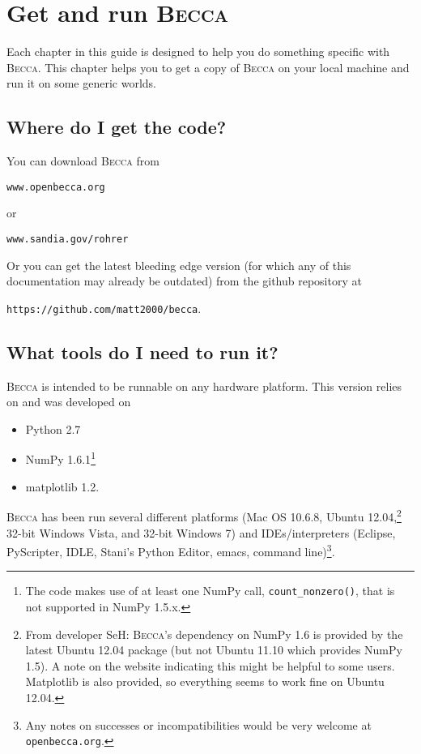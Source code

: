 \chapter{Get and run \textsc{Becca}}

Each chapter in this guide is designed to help you do something specific with \textsc{Becca}. This chapter helps you to get a copy of \textsc{Becca} on your local machine and run it on some generic worlds.

\section{Where do I get the code?}

You can download \textsc{Becca} from 

\texttt{www.openbecca.org} 

or 

\texttt{www.sandia.gov/rohrer} 

Or you can get the latest bleeding edge version (for which any of this documentation may already be outdated) from the github repository at

\texttt{https://github.com/matt2000/becca}.

\section{What tools do I need to run it?}

\textsc{Becca} is intended to be runnable on any hardware platform. This version relies on and was developed on 
\begin{itemize}
\item{Python 2.7}
\item{NumPy 1.6.1\footnote{The code makes use of at least one NumPy call, \texttt{count\_nonzero()}, that is not supported in NumPy 1.5.x.} }
\item{matplotlib 1.2}.
\end{itemize}
\textsc{Becca} has been run several different platforms (Mac OS 10.6.8, Ubuntu 12.04,\footnote{From developer SeH: \textsc{Becca}'s dependency on NumPy 1.6 is provided by the latest Ubuntu 12.04 package (but not Ubuntu 11.10 which provides NumPy 1.5).  A note on the website indicating this might be helpful to some users.  Matplotlib is also provided, so everything seems to work fine on Ubuntu 12.04.} 32-bit Windows Vista, and 32-bit Windows 7) and IDEs/interpreters (Eclipse, PyScripter, IDLE, Stani's Python Editor, emacs, command line)\footnote{Any notes on successes or incompatibilities would be very welcome at \texttt{openbecca.org}.}. 

